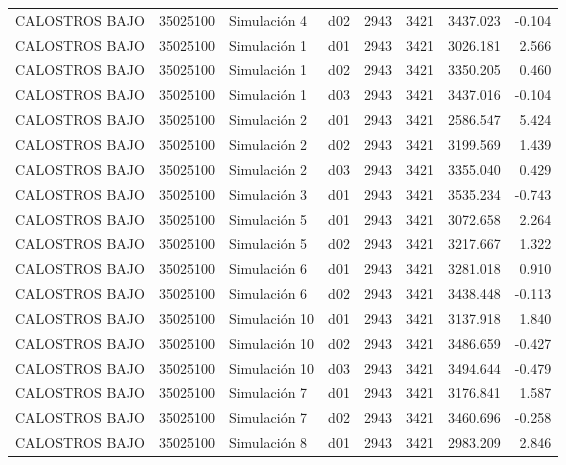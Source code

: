 \begin{landscape}
\begin{longtable}{lrlp{2cm}p{2cm}p{3cm}p{2cm}r}
          CALOSTROS BAJO &  35025100 &   Simulación 4 &   d02 &      2943 &     3421 &  3437.023 &    -0.104 \\
          CALOSTROS BAJO &  35025100 &   Simulación 1 &   d01 &      2943 &     3421 &  3026.181 &     2.566 \\
          CALOSTROS BAJO &  35025100 &   Simulación 1 &   d02 &      2943 &     3421 &  3350.205 &     0.460 \\
          CALOSTROS BAJO &  35025100 &   Simulación 1 &   d03 &      2943 &     3421 &  3437.016 &    -0.104 \\
          CALOSTROS BAJO &  35025100 &   Simulación 2 &   d01 &      2943 &     3421 &  2586.547 &     5.424 \\
          CALOSTROS BAJO &  35025100 &   Simulación 2 &   d02 &      2943 &     3421 &  3199.569 &     1.439 \\
          CALOSTROS BAJO &  35025100 &   Simulación 2 &   d03 &      2943 &     3421 &  3355.040 &     0.429 \\
          CALOSTROS BAJO &  35025100 &   Simulación 3 &   d01 &      2943 &     3421 &  3535.234 &    -0.743 \\
          CALOSTROS BAJO &  35025100 &   Simulación 5 &   d01 &      2943 &     3421 &  3072.658 &     2.264 \\
          CALOSTROS BAJO &  35025100 &   Simulación 5 &   d02 &      2943 &     3421 &  3217.667 &     1.322 \\
          CALOSTROS BAJO &  35025100 &   Simulación 6 &   d01 &      2943 &     3421 &  3281.018 &     0.910 \\
          CALOSTROS BAJO &  35025100 &   Simulación 6 &   d02 &      2943 &     3421 &  3438.448 &    -0.113 \\
          CALOSTROS BAJO &  35025100 &  Simulación 10 &   d01 &      2943 &     3421 &  3137.918 &     1.840 \\
          CALOSTROS BAJO &  35025100 &  Simulación 10 &   d02 &      2943 &     3421 &  3486.659 &    -0.427 \\
          CALOSTROS BAJO &  35025100 &  Simulación 10 &   d03 &      2943 &     3421 &  3494.644 &    -0.479 \\
          CALOSTROS BAJO &  35025100 &   Simulación 7 &   d01 &      2943 &     3421 &  3176.841 &     1.587 \\
          CALOSTROS BAJO &  35025100 &   Simulación 7 &   d02 &      2943 &     3421 &  3460.696 &    -0.258 \\
          CALOSTROS BAJO &  35025100 &   Simulación 8 &   d01 &      2943 &     3421 &  2983.209 &     2.846 \\

\end{longtable}
\end{landscape}
